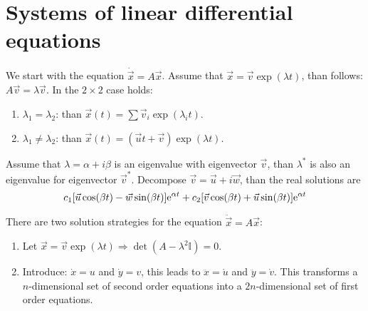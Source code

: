 \section{Systems of linear differential equations}
We start with the equation $\dot{\vec{x}}=A\vec{x}$. Assume that
$\vec{x}=\vec{v}\exp(\lambda t)$, than follows: $A\vec{v}=\lambda\vec{v}$.
In the $2\times2$ case holds:
\begin{enumerate}
	\item $\lambda_1=\lambda_2$: than $\vec{x}(t)=\sum\vec{v}_i\exp(\lambda_it)$.
	\item $\lambda_1\neq\lambda_2$: than $\vec{x}(t)=(\vec{u}t+\vec{v})\exp(\lambda t)$.
\end{enumerate}
Assume that $\lambda=\alpha+i\beta$ is an eigenvalue with eigenvector $\vec{v}$,
than $\lambda^*$ is also an eigenvalue for eigenvector $\vec{v}^*$. Decompose
$\vec{v}=\vec{u}+i\vec{w}$, than the real solutions are
\[
c_1[\vec{u}\cos(\beta t)-\vec{w}\sin(\beta t)]{\rm e}^{\alpha t}+c_2[\vec{v}\cos(\beta t)+\vec{u}\sin(\beta t)]{\rm e}^{\alpha t}
\]
 
There are two solution strategies for the equation $\ddot{\vec{x}}=A\vec{x}$:
\begin{enumerate}
	\item Let $\vec{x}=\vec{v}\exp(\lambda t)\Rightarrow\det(A-\lambda^2 \mathbb{I})=0$.
	\item Introduce: $\dot{x}=u$ and $\dot{y}=v$, this leads to $\ddot{x}=\dot{u}$ and
	$\ddot{y}=\dot{v}$. This transforms a $n$-dimensional set of second order
	equations into a $2n$-dimensional set of first order equations. 
\end{enumerate}
